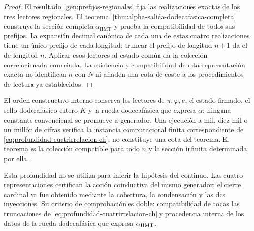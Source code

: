 \begin{proof}
El resultado~\ref{gen:prefijos-regionales} fija las realizaciones exactas
de los tres lectores regionales. El
teorema~\ref{thm:alpha-salida-dodecafasica-completa} construye la sección
completa \(\alpha_{\mathrm{HMT}}\) y prueba la compatibilidad de todos sus
prefijos. La expansión decimal canónica de cada una de estas
cuatro realizaciones tiene un único prefijo de cada longitud; truncar el
prefijo de longitud \(n+1\) da el de longitud \(n\). Aplicar esos lectores
al estado común da la colección correlacionada enunciada. La existencia y
compatibilidad de esta representación exacta no identifican \(n\) con \(N\)
ni añaden una cota de coste a los procedimientos de lectura ya establecidos.
\end{proof}

El orden constructivo interno conserva los lectores de
\(\pi,\varphi,e\), el estado firmado, el sello dodecafásico entero \(K\) y la rueda
dodecafásica que expresa \(\alpha\); ninguna constante convencional se
promueve a generador. Una ejecución a mil, diez mil o un millón de cifras
verifica la instancia computacional finita correspondiente de
\eqref{eq:profundidad-cuatrirrelacion-ch}; no constituye una cota del
teorema. El teorema es la colección compatible para todo \(n\) y la sección
infinita determinada por ella.

Esta profundidad no se utiliza para inferir la hipótesis del continuo. Las cuatro representaciones
certifican la acción coinductiva del mismo generador; el cierre cardinal ya fue
obtenido mediante la cobertura, la condensación y las dos inyecciones. Su
criterio de comprobación es doble: compatibilidad de todas las truncaciones
de \eqref{eq:profundidad-cuatrirrelacion-ch} y procedencia interna de los
datos de la rueda dodecafásica que expresa \(\alpha_{\rm HMT}\).

